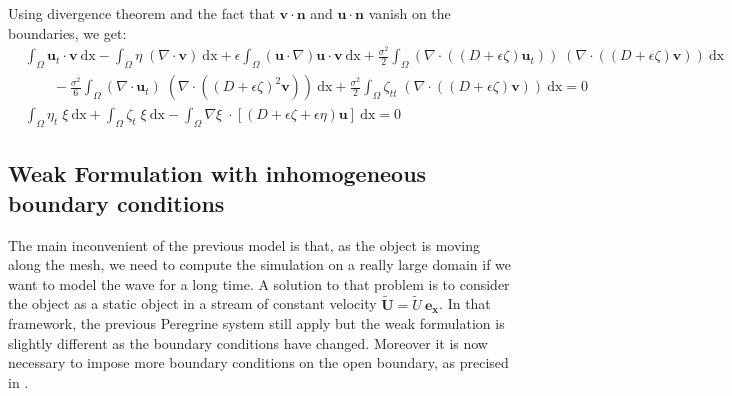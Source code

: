 \documentclass[11pt,a4paper]{article}
\begin{document}
	Using divergence theorem and the fact that $\mathbf{v} \cdot \mathbf{n}$ and $\mathbf{u} \cdot \mathbf{n}$ vanish on the boundaries, we get: 
	\begin{equation}
		\begin{split}
			&\int_{\Omega} \! \mathbf{u}_t \cdot \mathbf{v} \: \mathrm{dx} - \int_{\Omega} \! \eta \; (\nabla \cdot \mathbf{v}) \: \mathrm{dx} + \epsilon \! \int_{\Omega} \! (\mathbf{u} \cdot \nabla ) \mathbf{u} \cdot \mathbf{v} \: \mathrm{dx} + \frac{\sigma^2}{2} \! \int_{\Omega} \!  (\nabla \cdot ((D + \epsilon \zeta) \mathbf{u}_t)) \; (\nabla \cdot ((D + \epsilon \zeta) \mathbf{v}) )\: \mathrm{dx} \\
			&\qquad - \frac{\sigma^2}{6} \! \int_{\Omega} \! (\nabla \cdot \mathbf{u}_t) \; (\nabla  \cdot ((D + \epsilon \zeta)^2  \mathbf{v})) \: \mathrm{dx} + \frac{\sigma^2}{2} \! \int_{\Omega} \!  \zeta_{tt}  \; (\nabla \cdot( (D + \epsilon \zeta) \mathbf{v})) \: \mathrm{dx} = 0\\
			 &\int_{\Omega}\! \eta_t \; \xi \: \mathrm{dx} +\int_{\Omega}\! \zeta_t \; \xi \: \mathrm{dx} -\int_{\Omega}\! \nabla \xi \; \cdot [(D + \epsilon \zeta+\epsilon\eta) \mathbf{u}]  \: \mathrm{dx} = 0
		\end{split} 
	\end{equation}
			
	\pagebreak

\subsection{Weak Formulation with inhomogeneous boundary conditions}
	The main inconvenient of the previous model is that, as the object is moving along the mesh, we need to compute the simulation on a really large domain if we want to model the wave for a long time. A solution to that problem is to consider the object as a static object in a stream of constant velocity $\mathbf{\tilde U} = \tilde{U} \: \mathbf{e_x} $. In that framework, the previous Peregrine system still apply but the weak formulation is slightly different as the boundary conditions have changed. Moreover it is now necessary to impose more boundary conditions on the open boundary, as precised in \cite{}.
				
\end{document}
